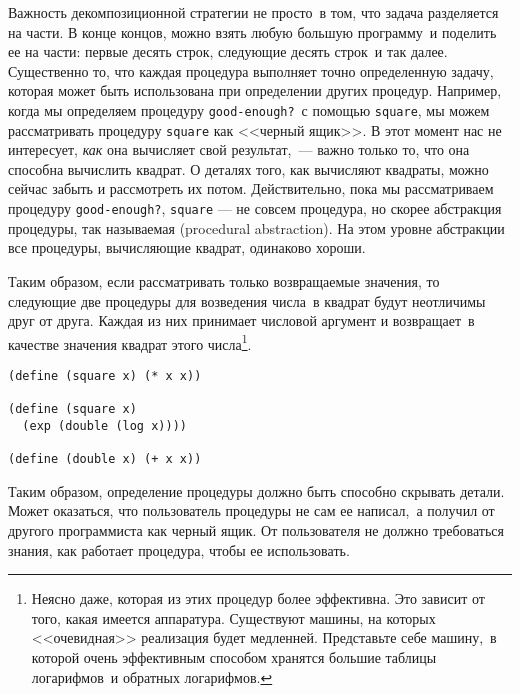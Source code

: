 Важность декомпозиционной стратегии не просто~в том, что
задача разделяется на части. В конце концов, можно взять любую
большую программу~и поделить ее на части: первые десять строк, следующие
десять строк~и так далее.  Существенно то, что каждая процедура
выполняет точно определенную задачу, которая может быть использована
при определении других процедур.  Например, когда мы определяем
процедуру {\tt good-enough?}~с помощью {\tt square}, мы
можем рассматривать процедуру {\tt square} 
как 
<<черный ящик>>.
В этот момент нас не интересует, {\em как} она
вычисляет свой результат,~--- важно только то, что она способна вычислить
квадрат. О деталях того, как вычисляют квадраты, можно сейчас забыть
и рассмотреть их потом.  Действительно, пока мы рассматриваем
процедуру {\tt good-enough?}, {\tt square} --- не совсем 
процедура, но скорее абстракция процедуры, так называемая 
 (procedural abstraction). На этом 
уровне абстракции все процедуры, вычисляющие квадрат, одинаково
хороши.

Таким образом, если рассматривать только возвращаемые
значения, то следующие две процедуры для возведения числа~в квадрат будут
неотличимы друг от друга. Каждая из них принимает числовой аргумент и
возвращает~в качестве значения квадрат этого числа\footnote{Неясно даже, которая из этих процедур более
эффективна.  Это зависит от того, какая имеется аппаратура.
Существуют машины, на которых <<очевидная>> реализация будет медленней.
Представьте себе машину,~в которой очень эффективным
способом хранятся большие таблицы логарифмов~и обратных
логарифмов.
}.

\begin{Verbatim}[fontsize=\small]
(define (square x) (* x x))

(define (square x) 
  (exp (double (log x))))

(define (double x) (+ x x))
\end{Verbatim}

Таким образом, определение процедуры должно быть способно
скрывать детали.  Может оказаться, что пользователь процедуры не сам
ее написал,~а получил от другого программиста как черный ящик.
От пользователя не должно требоваться знания, как работает процедура, чтобы 
ее использовать.


